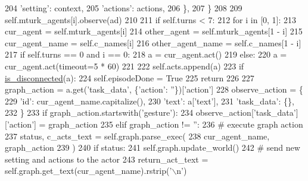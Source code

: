 \begin{DoxyCode}
204                         \textcolor{stringliteral}{'setting'}: context,
205                         \textcolor{stringliteral}{'actions'}: actions,
206                     \},
207                 \}
208 
209                 self.mturk\_agents[i].observe(ad)
210 
211         \textcolor{keywordflow}{if} self.turns < 7:
212             \textcolor{keywordflow}{for} i \textcolor{keywordflow}{in} [0, 1]:
213                 cur\_agent = self.mturk\_agents[i]
214                 other\_agent = self.mturk\_agents[1 - i]
215                 cur\_agent\_name = self.c\_names[i]
216                 other\_agent\_name = self.c\_names[1 - i]
217                 \textcolor{keywordflow}{if} self.turns == 0 \textcolor{keywordflow}{and} i == 0:
218                     a = cur\_agent.act()
219                 \textcolor{keywordflow}{else}:
220                     a = cur\_agent.act(timeout=5 * 60)
221 
222                 self.acts.append(a)
223                 \textcolor{keywordflow}{if} \hyperlink{namespacelight__chats_1_1worlds_a43b0aff73307cda95a089763b77f40d3}{is\_disconnected}(a):
224                     self.episodeDone = \textcolor{keyword}{True}
225                     \textcolor{keywordflow}{return}
226 
227                 graph\_action = a.get(\textcolor{stringliteral}{'task\_data'}, \{\textcolor{stringliteral}{'action'}: \textcolor{stringliteral}{''}\})[\textcolor{stringliteral}{'action'}]
228                 observe\_action = \{
229                     \textcolor{stringliteral}{'id'}: cur\_agent\_name.capitalize(),
230                     \textcolor{stringliteral}{'text'}: a[\textcolor{stringliteral}{'text'}],
231                     \textcolor{stringliteral}{'task\_data'}: \{\},
232                 \}
233                 \textcolor{keywordflow}{if} graph\_action.startswith(\textcolor{stringliteral}{'gesture'}):
234                     observe\_action[\textcolor{stringliteral}{'task\_data'}][\textcolor{stringliteral}{'action'}] = graph\_action
235                 \textcolor{keywordflow}{elif} graph\_action != \textcolor{stringliteral}{''}:
236                     \textcolor{comment}{# execute graph action}
237                     status, c\_acts\_text = self.graph.parse\_exec(
238                         cur\_agent\_name, graph\_action
239                     )
240                     \textcolor{keywordflow}{if} status:
241                         self.graph.update\_world()
242                     \textcolor{comment}{# send new setting and actions to the actor}
243                     return\_act\_text = self.graph.get\_text(cur\_agent\_name).rstrip(\textcolor{stringliteral}{'\(\backslash\)n'})

\end{DoxyCode}
